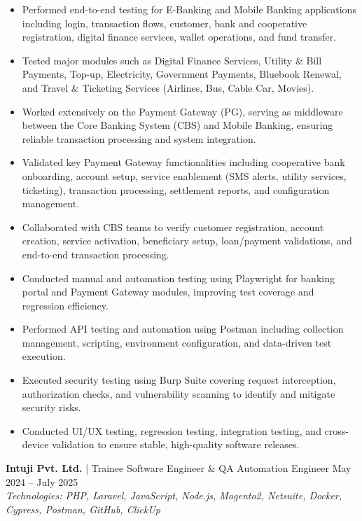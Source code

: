 \documentclass[a4paper,10pt]{article}
\begin{document}
\begin{itemize}
    \item Performed end-to-end testing for E-Banking and Mobile Banking applications including login, transaction flows, customer, bank and cooperative registration, digital finance services, wallet operations, and fund transfer.
    \item Tested major modules such as Digital Finance Services, Utility \& Bill Payments, Top-up, Electricity, Government Payments, Bluebook Renewal, and Travel \& Ticketing Services (Airlines, Bus, Cable Car, Movies).
    \item Worked extensively on the Payment Gateway (PG), serving as middleware between the Core Banking System (CBS) and Mobile Banking, ensuring reliable transaction processing and system integration.
    \item Validated key Payment Gateway functionalities including cooperative bank onboarding, account setup, service enablement (SMS alerts, utility services, ticketing), transaction processing, settlement reports, and configuration management.
    \item Collaborated with CBS teams to verify customer registration, account creation, service activation, beneficiary setup, loan/payment validations, and end-to-end transaction processing.
    \item Conducted manual and automation testing using Playwright for banking portal and Payment Gateway modules, improving test coverage and regression efficiency.
    \item Performed API testing and automation using Postman including collection management, scripting, environment configuration, and data-driven test execution.
    \item Executed security testing using Burp Suite covering request interception, authorization checks, and vulnerability scanning to identify and mitigate security risks.
    \item Conducted UI/UX testing, regression testing, integration testing, and cross-device validation to ensure stable, high-quality software releases.
\end{itemize}


\textbf{Intuji Pvt. Ltd.} | Trainee Software Engineer \& QA Automation Engineer \hfill May 2024 -- July 2025 \\
\textit{Technologies: PHP, Laravel, JavaScript, Node.js, Magento2, Netsuite, Docker, Cypress, Postman, GitHub, ClickUp}
\end{document}
